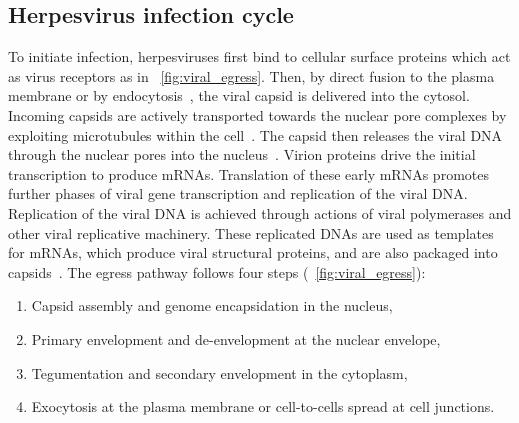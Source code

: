 \subsection{Herpesvirus infection cycle}
To initiate infection, herpesviruses first bind to cellular surface proteins which act as virus receptors as in \figurename~\ref{fig:viral_egress}.
Then, by direct fusion to the plasma membrane or by endocytosis~\cite{heldweinEntryHerpesvirusesMammalian2008}, the viral \gls{capsid} is delivered into the cytosol.
Incoming capsids are actively transported towards the nuclear pore complexes by exploiting microtubules within the cell~\cite{radtkeMinusEndDirectedMicrotubule2010,sodeikMicrotubulemediatedTransportIncoming1997}.
The capsid then releases the viral DNA through the nuclear pores into the nucleus~\cite{ojalaHerpesSimplexVirus2000}.
Virion proteins drive the initial transcription to produce %
mRNAs.
Translation of these early mRNAs promotes further phases of viral gene transcription and replication of the viral DNA.
Replication of the viral DNA is achieved through actions of viral polymerases and other viral replicative machinery.
These replicated DNAs are used as templates for mRNAs, which produce viral structural proteins, and are also packaged into capsids~\cite{bainesHerpesSimplexVirus2011a}.
The egress pathway follows four steps (\figurename~\ref{fig:viral_egress}):

\begin{samepage}
  \begin{enumerate}
    \item Capsid assembly and genome encapsidation in the nucleus,
    \item Primary envelopment and de-envelopment at the nuclear envelope,
    \item Tegumentation and secondary envelopment in the cytoplasm,
    \item Exocytosis at the plasma membrane or cell-to-cells spread at cell junctions.
  \end{enumerate}
\end{samepage}

